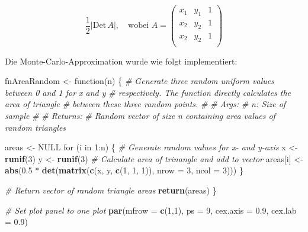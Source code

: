 \documentclass[10pt,]{article}
\newenvironment{Shaded}{\begin{snugshade}}{\end{snugshade}}
\newcommand{\KeywordTok}[1]{\textcolor[rgb]{0.13,0.29,0.53}{\textbf{{#1}}}}
\newcommand{\DataTypeTok}[1]{\textcolor[rgb]{0.13,0.29,0.53}{{#1}}}
\newcommand{\DecValTok}[1]{\textcolor[rgb]{0.00,0.00,0.81}{{#1}}}
\newcommand{\FloatTok}[1]{\textcolor[rgb]{0.00,0.00,0.81}{{#1}}}
\newcommand{\StringTok}[1]{\textcolor[rgb]{0.31,0.60,0.02}{{#1}}}
\newcommand{\CommentTok}[1]{\textcolor[rgb]{0.56,0.35,0.01}{\textit{{#1}}}}
\newcommand{\OtherTok}[1]{\textcolor[rgb]{0.56,0.35,0.01}{{#1}}}
\newcommand{\NormalTok}[1]{{#1}}
\begin{document}
\begin{equation*}
\frac{1}{2}|\text{Det}\,A|,\quad\text{wobei } A = \begin{pmatrix}x_1 & y_1 & 1\\ x_2 & y_2 & 1\\ x_2 & y_2 & 1\\\end{pmatrix}
\end{equation*}

Die Monte-Carlo-Approximation wurde wie folgt implementiert:

\begin{Shaded}
\begin{Highlighting}[]
\NormalTok{fnAreaRandom <-}\StringTok{ }\NormalTok{function(n) \{}
  \CommentTok{# Generate three random uniform values between 0 and 1 for x and y}
  \CommentTok{# respectively. The function directly calculates the area of triangle}
  \CommentTok{# between these three random points.}
  \CommentTok{# }
  \CommentTok{# Args:}
  \CommentTok{#   n: Size of sample}
  \CommentTok{#   }
  \CommentTok{# Returns:}
  \CommentTok{#   Random vector of size n containing area values of random triangles}
  
  \NormalTok{areas <-}\StringTok{ }\OtherTok{NULL}
  \NormalTok{for (i in }\DecValTok{1}\NormalTok{:n) \{}
    \CommentTok{# Generate random values for x- and y-axis}
    \NormalTok{x <-}\StringTok{ }\KeywordTok{runif}\NormalTok{(}\DecValTok{3}\NormalTok{)}
    \NormalTok{y <-}\StringTok{ }\KeywordTok{runif}\NormalTok{(}\DecValTok{3}\NormalTok{)}
    \CommentTok{# Calculate area of trinangle and add to vector}
    \NormalTok{areas[i] <-}\StringTok{ }\KeywordTok{abs}\NormalTok{(}\FloatTok{0.5} \NormalTok{*}\StringTok{ }\KeywordTok{det}\NormalTok{(}\KeywordTok{matrix}\NormalTok{(}\KeywordTok{c}\NormalTok{(x, y, }\KeywordTok{c}\NormalTok{(}\DecValTok{1}\NormalTok{, }\DecValTok{1}\NormalTok{, }\DecValTok{1}\NormalTok{)), }\DataTypeTok{nrow =} \DecValTok{3}\NormalTok{, }\DataTypeTok{ncol =} \DecValTok{3}\NormalTok{)))}
  \NormalTok{\}}
  
  \CommentTok{# Return vector of random triangle areas}
  \KeywordTok{return}\NormalTok{(areas)}
\NormalTok{\}}

\CommentTok{# Set plot panel to one plot}
\KeywordTok{par}\NormalTok{(}\DataTypeTok{mfrow =} \KeywordTok{c}\NormalTok{(}\DecValTok{1}\NormalTok{,}\DecValTok{1}\NormalTok{), }\DataTypeTok{ps =} \DecValTok{9}\NormalTok{, }\DataTypeTok{cex.axis =} \FloatTok{0.9}\NormalTok{, }\DataTypeTok{cex.lab =} \FloatTok{0.9}\NormalTok{)}


\end{Highlighting}
\end{Shaded}
\end{document}
